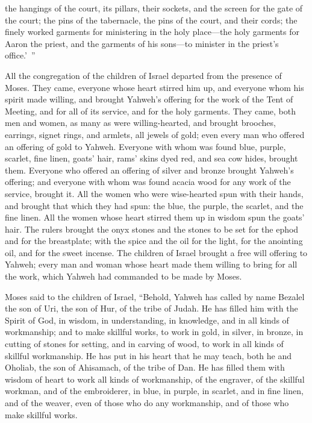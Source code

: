 {the hangings of the court, its pillars, their sockets, and the screen for the gate of the court;
the pins of the tabernacle, the pins of the court, and their cords;
the finely worked garments for ministering in the holy place—the holy garments for Aaron the priest, and the garments of his sons—to minister in the priest’s office.’ ”
\par }{\PP {}All the congregation of the children of Israel departed from the presence of Moses.
They came, everyone whose heart stirred him up, and everyone whom his spirit made willing, and brought Yahweh’s offering for the work of the Tent of Meeting, and for all of its service, and for the holy garments.
They came, both men and women, as many as were willing-hearted, and brought brooches, earrings, signet rings, and armlets, all jewels of gold; even every man who offered an offering of gold to Yahweh.
Everyone with whom was found blue, purple, scarlet, fine linen, goats’ hair, rams’ skins dyed red, and sea cow hides, brought them.
Everyone who offered an offering of silver and bronze brought Yahweh’s offering; and everyone with whom was found acacia wood for any work of the service, brought it.
All the women who were wise-hearted spun with their hands, and brought that which they had spun: the blue, the purple, the scarlet, and the fine linen.
All the women whose heart stirred them up in wisdom spun the goats’ hair.
The rulers brought the onyx stones and the stones to be set for the ephod and for the breastplate;
with the spice and the oil for the light, for the anointing oil, and for the sweet incense.
The children of Israel brought a free will offering to Yahweh; every man and woman whose heart made them willing to bring for all the work, which Yahweh had commanded to be made by Moses.
\par }{\PP {}Moses said to the children of Israel, “Behold, Yahweh has called by name Bezalel the son of Uri, the son of Hur, of the tribe of Judah.
He has filled him with the Spirit of God, in wisdom, in understanding, in knowledge, and in all kinds of workmanship;
and to make skillful works, to work in gold, in silver, in bronze,
in cutting of stones for setting, and in carving of wood, to work in all kinds of skillful workmanship.
He has put in his heart that he may teach, both he and Oholiab, the son of Ahisamach, of the tribe of Dan.
He has filled them with wisdom of heart to work all kinds of workmanship, of the engraver, of the skillful workman, and of the embroiderer, in blue, in purple, in scarlet, and in fine linen, and of the weaver, even of those who do any workmanship, and of those who make skillful works.

}
